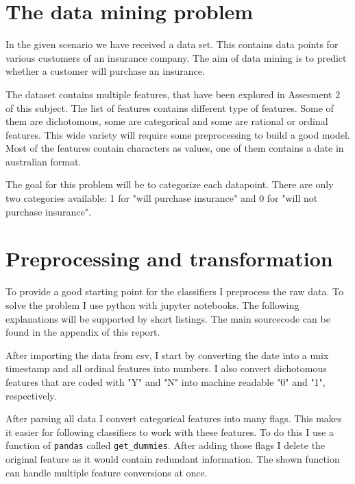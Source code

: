 
\section{The data mining problem}

In the given scenario we have received a data set. This contains data points for various customers of an insurance company. The aim of data mining is to predict whether a customer will purchase an insurance. 

The dataset contains multiple features, that have been explored in Assesment 2 of this subject. The list of features contains different type of features. Some of them are dichotomous, some are categorical and some are rational or ordinal features. This wide variety will require some preprocessing to build a good model. Most of the features contain characters as values, one of them contains a date in australian format.

The goal for this problem will be to categorize each datapoint. There are only two categories available: 1 for "will purchase insurance" and 0 for "will not purchase insurance".


\section{Preprocessing and transformation}

To provide a good starting point for the classifiers I preprocess the raw data. To solve the problem I use python with jupyter notebooks. The following explanations will be supported by short listings. The main sourcecode can be found in the appendix of this report.

After importing the data from csv, I start by converting the date into a unix timestamp and all ordinal features into numbers. I also convert dichotomous features that are coded with "Y" and "N" into machine readable "0" and "1", respectively.



After parsing all data I convert categorical features into many flags. This makes it easier for following classifiers to work with these features. To do this I use a function of \texttt{pandas} called \texttt{get\_dummies}. After adding those flags I delete the original feature as it would contain redundant information. The shown function can handle multiple feature conversions at once.

